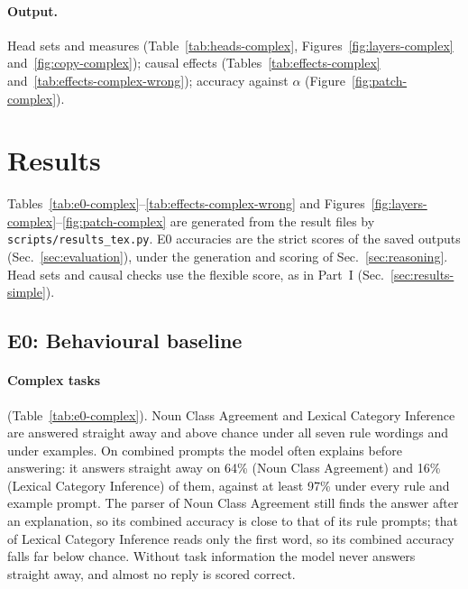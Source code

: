 \documentclass[11pt,a4paper]{article}
\begin{document}
\paragraph{Output.} Head sets and measures (Table~\ref{tab:heads-complex}, Figures~\ref{fig:layers-complex} and~\ref{fig:copy-complex}); causal effects (Tables~\ref{tab:effects-complex} and~\ref{tab:effects-complex-wrong}); accuracy against $\alpha$ (Figure~\ref{fig:patch-complex}).

\section{Results}\label{sec:results-complex}
Tables~\ref{tab:e0-complex}--\ref{tab:effects-complex-wrong} and Figures~\ref{fig:layers-complex}--\ref{fig:patch-complex} are generated from the result files by \texttt{scripts/results\_tex.py}. E0 accuracies are the strict scores of the saved outputs (Sec.~\ref{sec:evaluation}), under the generation and scoring of Sec.~\ref{sec:reasoning}. Head sets and causal checks use the flexible score, as in Part~I (Sec.~\ref{sec:results-simple}).

\subsection{E0: Behavioural baseline}\label{sec:res-e0-complex}
\paragraph{Complex tasks} (Table~\ref{tab:e0-complex}). Noun Class Agreement and Lexical Category Inference are answered straight away and above chance under all seven rule wordings and under examples. On combined prompts the model often explains before answering: it answers straight away on 64\% (Noun Class Agreement) and 16\% (Lexical Category Inference) of them, against at least 97\% under every rule and example prompt. The parser of Noun Class Agreement still finds the answer after an explanation, so its combined accuracy is close to that of its rule prompts; that of Lexical Category Inference reads only the first word, so its combined accuracy falls far below chance. Without task information the model never answers straight away, and almost no reply is scored correct.
\end{document}
